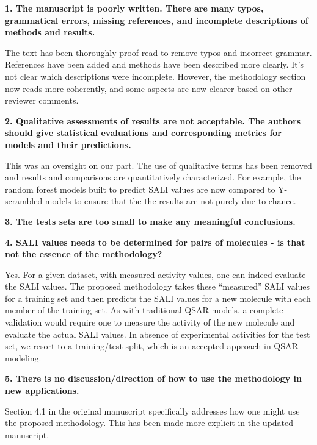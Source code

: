 \documentclass[letterpaper, 12pt]{article}
\begin{document}

\textbf{1.  The manuscript is poorly written.  There are many typos, grammatical errors, missing
  references, and incomplete descriptions of methods and results.}

The text has been thoroughly proof read to remove typos and incorrect grammar. References have been
added and methods have been described more clearly. It's not clear which descriptions were
incomplete. However, the methodology section now reads more coherently, and some aspects are now
clearer based on other reviewer comments.

\textbf{2.  Qualitative assessments of results are not acceptable.  The authors should give
  statistical evaluations and corresponding metrics for models and their predictions.}

This was an oversight on our part. The use of qualitative terms has been removed and results and
comparisons are quantitatively characterized. For example, the random forest models built to predict
SALI values are now compared to Y-scrambled models to ensure that the the results are not purely due
to chance.

\textbf{3.  The tests sets are too small to make any meaningful conclusions.}

\textbf{4.  SALI values needs to be determined for pairs of molecules - is that not the essence of
  the methodology?}

Yes. For a given dataset, with measured activity values, one can indeed evaluate the SALI
values. The proposed methodology takes these ``measured'' SALI values for a training set and then
predicts the SALI values for a new molecule with each member of the training set. As with
traditional QSAR models, a complete validation would require one to measure the activity of the new
molecule and evaluate the actual SALI values. In absence of experimental activities for the test
set, we resort to a training/test split, which is an accepted approach in QSAR modeling.

\textbf{5.  There is no discussion/direction of how to use the methodology in new applications.}

Section 4.1 in the original manuscript specifically addresses how one might use the proposed
methodology. This has been made more explicit in the updated manuscript.
\end{document}
